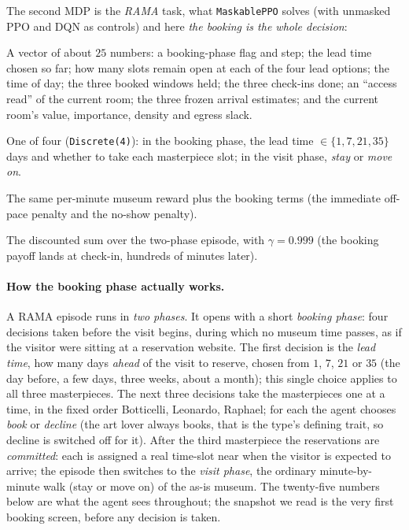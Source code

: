 \documentclass[11pt]{article}
\newcommand{\key}[1]{\textit{#1}}            %
\begin{document}
The second MDP is the \key{RAMA} task, what \texttt{MaskablePPO} solves (with unmasked PPO and
DQN as controls) and here \emph{the booking is the whole decision}:
\begin{description}[leftmargin=0pt,style=nextline,itemsep=2pt]
\item[State] A vector of about $25$ numbers: a booking-phase flag and step; the lead time
chosen so far; how many slots remain open at each of the four lead options; the time of day;
the three booked windows held; the three check-ins done; an ``access read'' of the current
room; the three frozen arrival estimates; and the current room's value, importance, density
and egress slack.
\item[Action] One of four (\texttt{Discrete(4)}): in the booking phase, the lead time
$\in\{1,7,21,35\}$ days and whether to take each masterpiece slot; in the visit phase,
\emph{stay} or \emph{move on}.
\item[Reward] The same per-minute museum reward plus the booking terms (the immediate off-pace
penalty and the no-show penalty).
\item[Return / Discount] The discounted sum over the two-phase episode, with $\gamma = 0.999$
(the booking payoff lands at check-in, hundreds of minutes later).
\end{description}

\paragraph{How the booking phase actually works.} A RAMA episode runs in \emph{two phases}. It opens
with a short \emph{booking phase}: four decisions taken before the visit begins, during which no museum
time passes, as if the visitor were sitting at a reservation website. The first decision is the
\emph{lead time}, how many days \emph{ahead} of the visit to reserve, chosen from $1$, $7$, $21$ or
$35$ (the day before, a few days, three weeks, about a month); this single choice applies to all three
masterpieces. The next three decisions take the masterpieces one at a time, in the fixed order
Botticelli, Leonardo, Raphael; for each the agent chooses \emph{book} or \emph{decline} (the art lover
always books, that is the type's defining trait, so decline is switched off for it). After the third
masterpiece the reservations are \emph{committed}: each is assigned a real time-slot near when the
visitor is expected to arrive; the episode then switches to the \emph{visit phase}, the ordinary
minute-by-minute walk (stay or move on) of the as-is museum. The twenty-five numbers below are what the
agent sees throughout; the snapshot we read is the very first booking screen, before any decision is
taken.
\end{document}
